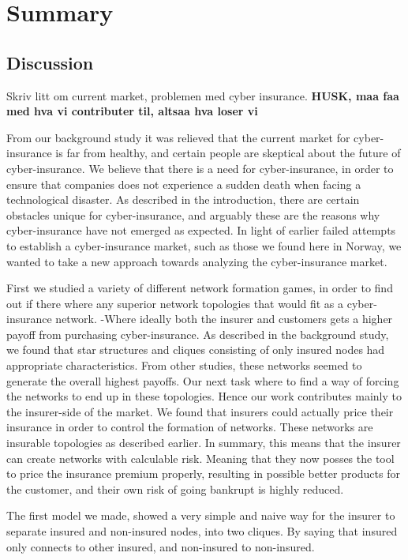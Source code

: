 \chapter{Summary}

\section{Discussion}
Skriv litt om current market, problemen med cyber insurance.
\textbf{HUSK, maa faa med hva vi contributer til, altsaa hva loser vi}

From our background study it was relieved that the current market for cyber-insurance is far from healthy, and certain people are skeptical about the future of cyber-insurance. We believe that there is a need for cyber-insurance, in order to ensure that companies does not experience a sudden death when facing a technological disaster. As described in the introduction, there are certain obstacles unique for cyber-insurance, and arguably these are the reasons why cyber-insurance have not emerged as expected. In light of earlier failed attempts to establish a cyber-insurance market, such as those we found here in Norway, we wanted to take a new approach towards analyzing the cyber-insurance market. 

First we studied a variety of different network formation games, in order to find out if there where any superior network topologies that would fit as a cyber-insurance network. -Where ideally both the insurer and customers gets a higher payoff from purchasing cyber-insurance. As described in the background study, we found that star structures and cliques consisting of only insured nodes had appropriate characteristics.  From other studies, these networks seemed to generate the overall highest payoffs. Our next task where to find a way of forcing the networks to end up in these topologies. Hence our work contributes mainly to the insurer-side of the market. We found that insurers could actually price their insurance in order to control the formation of networks. These networks are insurable topologies as described earlier. In summary, this means that the insurer can create networks with calculable risk. Meaning that they now posses the tool to price the insurance premium properly, resulting in possible better products for the customer, and their own risk of going bankrupt is highly reduced.

The first model we made, showed a very simple and naive way for the insurer to separate insured and non-insured nodes, into two cliques. By saying that insured only connects to other insured, and non-insured to non-insured. 

